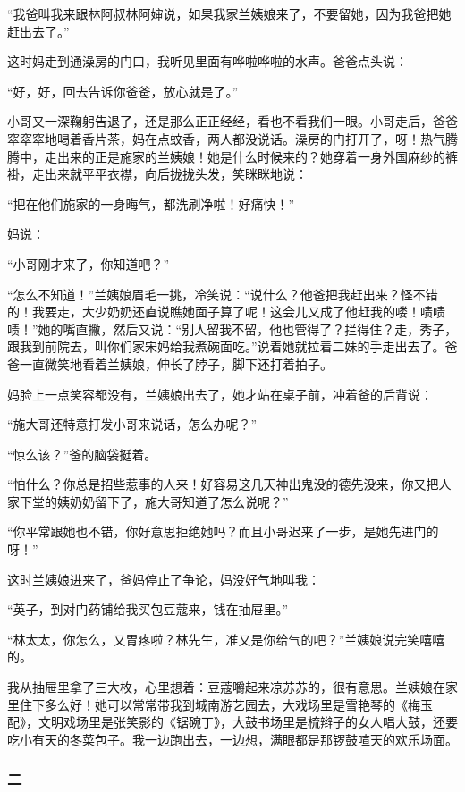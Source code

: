 \par “我爸叫我来跟林阿叔林阿婶说，如果我家兰姨娘来了，不要留她，因为我爸把她赶出去了。”
\par 这时妈走到通澡房的门口，我听见里面有哗啦哗啦的水声。爸爸点头说：
\par “好，好，回去告诉你爸爸，放心就是了。”
\par 小哥又一深鞠躬告退了，还是那么正正经经，看也不看我们一眼。小哥走后，爸爸窣窣窣地喝着香片茶，妈在点蚊香，两人都没说话。澡房的门打开了，呀！热气腾腾中，走出来的正是施家的兰姨娘！她是什么时候来的？她穿着一身外国麻纱的裤褂，走出来就平平衣襟，向后拢拢头发，笑眯眯地说：
\par “把在他们施家的一身晦气，都洗刷净啦！好痛快！”
\par 妈说：
\par “小哥刚才来了，你知道吧？”
\par “怎么不知道！”兰姨娘眉毛一挑，冷笑说：“说什么？他爸把我赶出来？怪不错的！我要走，大少奶奶还直说瞧她面子算了呢！这会儿又成了他赶我的喽！啧啧啧！”她的嘴直撇，然后又说：“别人留我不留，他也管得了？拦得住？走，秀子，跟我到前院去，叫你们家宋妈给我煮碗面吃。”说着她就拉着二妹的手走出去了。爸爸一直微笑地看着兰姨娘，伸长了脖子，脚下还打着拍子。
\par 妈脸上一点笑容都没有，兰姨娘出去了，她才站在桌子前，冲着爸的后背说：
\par “施大哥还特意打发小哥来说话，怎么办呢？”
\par “惊么该？”爸的脑袋挺着。
\par “怕什么？你总是招些惹事的人来！好容易这几天神出鬼没的德先没来，你又把人家下堂的姨奶奶留下了，施大哥知道了怎么说呢？”
\par “你平常跟她也不错，你好意思拒绝她吗？而且小哥迟来了一步，是她先进门的呀！”
\par 这时兰姨娘进来了，爸妈停止了争论，妈没好气地叫我：
\par “英子，到对门药铺给我买包豆蔻来，钱在抽屉里。”
\par “林太太，你怎么，又胃疼啦？林先生，准又是你给气的吧？”兰姨娘说完笑嘻嘻的。
\par 我从抽屉里拿了三大枚，心里想着：豆蔻嚼起来凉苏苏的，很有意思。兰姨娘在家里住下多么好！她可以常常带我到城南游艺园去，大戏场里是雪艳琴的《梅玉配》，文明戏场里是张笑影的《锯碗丁》，大鼓书场里是梳辫子的女人唱大鼓，还要吃小有天的冬菜包子。我一边跑出去，一边想，满眼都是那锣鼓喧天的欢乐场面。


\subsubsection*{二}

